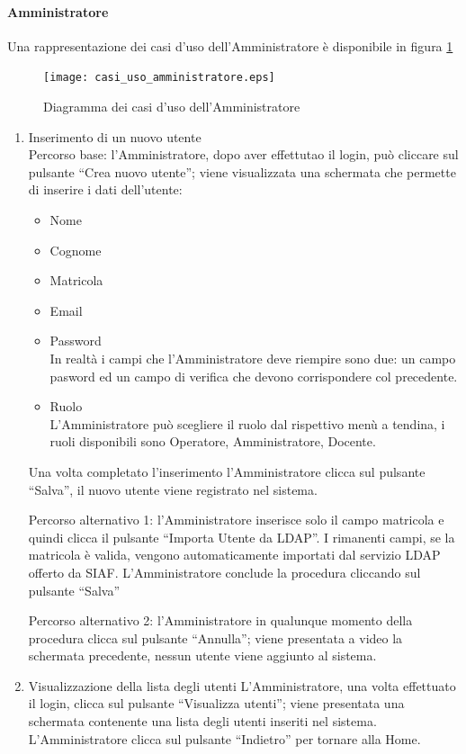 \paragraph{Amministratore}
Una rappresentazione dei casi d'uso dell'Amministratore è disponibile in figura \ref{use_case_diag_admin}
\begin{figure}[h]
  \caption{Diagramma dei casi d'uso dell'Amministratore}
  \label{use_case_diag_admin}
  \centering
    \texttt{[image: casi\_uso\_amministratore.eps]}
\end{figure}


\begin{enumerate}
 \item Inserimento di un nuovo utente\\
 
 
 Percorso base:
 l'Amministratore, dopo aver effettutao il login, può cliccare sul pulsante ``Crea nuovo utente''; viene visualizzata una schermata che permette
 di inserire i dati dell'utente:
 \begin{itemize}
  \item Nome
  \item Cognome
  \item Matricola
  \item Email
  \item	Password\\
    In realtà i campi che l'Amministratore deve riempire sono due: un campo pasword ed un campo di verifica che devono corrispondere col precedente.
  \item Ruolo\\
    L'Amministratore può scegliere il ruolo dal rispettivo menù a tendina, i ruoli disponibili sono Operatore, Amministratore, Docente.
 \end{itemize}
 
 Una volta completato l'inserimento l'Amministratore clicca sul pulsante ``Salva'', il nuovo utente viene registrato nel sistema. 

 Percorso alternativo 1:
 l'Amministratore inserisce solo il campo matricola e quindi clicca il pulsante ``Importa Utente da LDAP''. I rimanenti campi, se la matricola è valida,
 vengono automaticamente importati dal servizio LDAP offerto da SIAF. L'Amministratore conclude la procedura cliccando sul pulsante ``Salva''
 
 Percorso alternativo 2:
 l'Amministratore in qualunque momento della procedura clicca sul pulsante ``Annulla''; viene presentata a video la schermata precedente,
 nessun utente viene aggiunto al sistema.
 
 \item Visualizzazione della lista degli utenti
  L'Amministratore, una volta effettuato il login, clicca sul pulsante ``Visualizza utenti''; viene presentata una schermata contenente una lista  degli
  utenti inseriti nel sistema. L'Amministratore clicca sul pulsante ``Indietro'' per tornare alla Home.
\end{enumerate}

